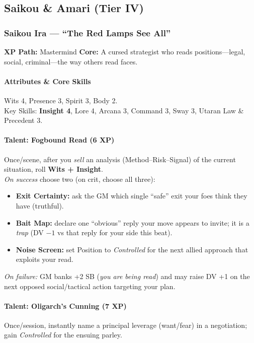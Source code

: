 

\subsection{Saikou \& Amari (Tier IV)}

\subsubsection{Saikou Ira --- ``The Red Lamps See All''}
\textbf{XP Path:} Mastermind \quad
\textbf{Core:} A cursed strategist who reads positions---legal, social, criminal---the way others read faces.

\paragraph{Attributes \& Core Skills}
Wits 4, Presence 3, Spirit 3, Body 2.\\
Key Skills: \textbf{Insight 4}, Lore 4, Arcana 3, Command 3, Sway 3, Utaran Law \& Precedent 3.

\paragraph{Talent: Fogbound Read (6 XP)}
Once/scene, after you \emph{sell} an analysis (Method--Risk--Signal) of the current situation, roll \textbf{Wits + Insight}.\\
\emph{On success} choose two (on crit, choose all three):
\begin{itemize}
  \item \textbf{Exit Certainty:} ask the GM which single ``safe'' exit your foes think they have (truthful).
  \item \textbf{Bait Map:} declare one ``obvious'' reply your move appears to invite; it is a \emph{trap} (DV $-1$ vs that reply for your side this beat).
  \item \textbf{Noise Screen:} set Position to \emph{Controlled} for the next allied approach that exploits your read.
\end{itemize}
\emph{On failure:} GM banks +2 SB (\emph{you are being read}) and may raise DV +1 on the next opposed social/tactical action targeting your plan.

\paragraph{Talent: Oligarch's Cunning (7 XP)}
Once/session, instantly name a principal leverage (want/fear) in a negotiation; gain \emph{Controlled} for the ensuing parley.

